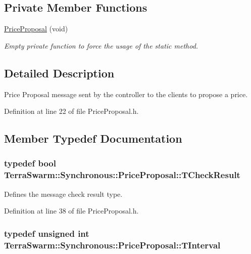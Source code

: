 \subsection*{Private Member Functions}
\begin{DoxyCompactItemize}
\item 
\hyperlink{class_terra_swarm_1_1_synchronous_1_1_price_proposal_a463100bd56cb523af80b7e35e1d2dbe5}{Price\-Proposal} (void)
\begin{DoxyCompactList}\small\item\em Empty private function to force the usage of the static method. \end{DoxyCompactList}\end{DoxyCompactItemize}


\subsection{Detailed Description}
Price Proposal message sent by the controller to the clients to propose a price. 

Definition at line 22 of file Price\-Proposal.\-h.



\subsection{Member Typedef Documentation}
\hypertarget{class_terra_swarm_1_1_synchronous_1_1_price_proposal_ab5aef6a74a44439eb880f7dbff610b57}{
\subsubsection[{T\-Check\-Result}]{\setlength{\rightskip}{0pt plus 5cm}typedef bool {\bf Terra\-Swarm\-::\-Synchronous\-::\-Price\-Proposal\-::\-T\-Check\-Result}}}\label{class_terra_swarm_1_1_synchronous_1_1_price_proposal_ab5aef6a74a44439eb880f7dbff610b57}


Defines the message check result type. 



Definition at line 38 of file Price\-Proposal.\-h.

\hypertarget{class_terra_swarm_1_1_synchronous_1_1_price_proposal_a37e6344d030c7695bb9cb341648928ee}{
\subsubsection[{T\-Interval}]{\setlength{\rightskip}{0pt plus 5cm}typedef unsigned int {\bf Terra\-Swarm\-::\-Synchronous\-::\-Price\-Proposal\-::\-T\-Interval}}}\label{class_terra_swarm_1_1_synchronous_1_1_price_proposal_a37e6344d030c7695bb9cb341648928ee}


